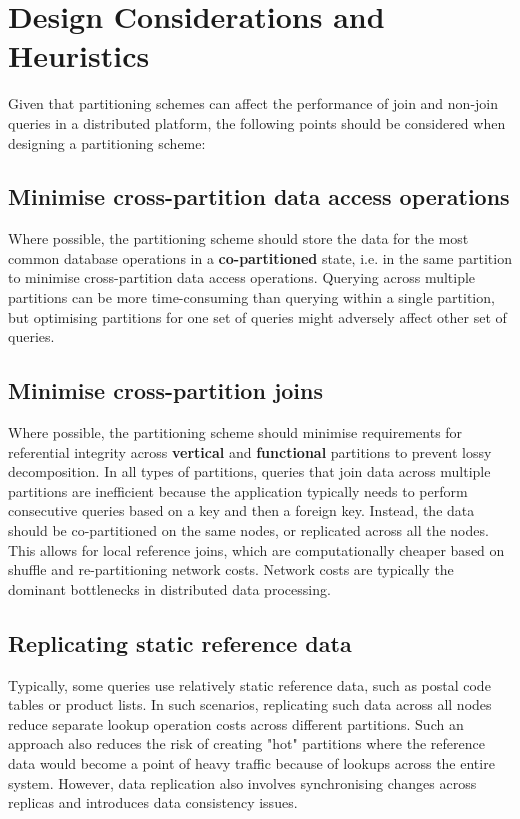 \section{Design Considerations and Heuristics}
Given that partitioning schemes can affect the performance of join and non-join queries in a distributed platform, the following points should be considered when designing a partitioning scheme:

\subsection{Minimise cross-partition data access operations} 
Where possible, the partitioning scheme should store the data for the most common database operations in a \textbf{co-partitioned} state, i.e. in the same partition to minimise cross-partition data access operations. Querying across multiple partitions can be more time-consuming than querying within a single partition, but optimising partitions for one set of queries might adversely affect other set of queries. 

\subsection{Minimise cross-partition joins}
Where possible, the partitioning scheme should minimise requirements for referential integrity across \textbf{vertical} and \textbf{functional} partitions to prevent lossy decomposition. In all types of partitions, queries that join data across multiple partitions are inefficient because the application typically needs to perform consecutive queries based on a key and then a foreign key. Instead, the data should be co-partitioned on the same nodes, or replicated across all the nodes. This allows for local reference joins, which are computationally cheaper based on shuffle and re-partitioning network costs. Network costs are typically the dominant bottlenecks in distributed data processing.

\subsection{Replicating static reference data}
Typically, some queries use relatively static reference data, such as postal code tables or product lists. In such scenarios, replicating such data across all nodes reduce separate lookup operation costs across different partitions. Such an approach also reduces the risk of creating "hot" partitions where the reference data would become a point of heavy traffic because of lookups across the entire system. However, data replication also involves synchronising changes across replicas and introduces data consistency issues. 

